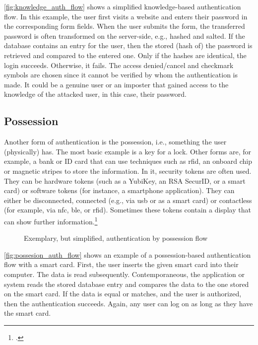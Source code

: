 \autoref{fig:knowledge_auth_flow} shows a simplified knowledge-based authentication flow. In this example, the user first visits a website and enters their password in the corresponding form fields. When the user submits the form, the transferred password is often transformed on the server-side, e.g., hashed and salted. If the database contains an entry for the user, then the stored (hash of) the password is retrieved and compared to the entered one. Only if the hashes are identical, the login succeeds. Otherwise, it fails. The \frqq access denied/cancel\flqq{} and \frqq checkmark\flqq{} symbols are chosen since it cannot be verified by whom the authentication is made. It could be a genuine user or an imposter that gained access to the knowledge of the attacked user, in this case, their password.

\subsection{Possession}

Another form of authentication is the possession, i.e., \frqq something the user (physically) has\flqq{}. The most basic example is a key for a lock. Other forms are, for example, a bank or ID card that can use techniques such as \gls{rfid}, an onboard chip or magnetic stripes to store the information. In \gls{it}, security tokens are often used. They can be hardware tokens (such as a YubiKey, an RSA SecurID, or a smart card) or software tokens (for instance, a smartphone application). They can either be disconnected, connected (e.g., via \gls{usb} or as a smart card) or contactless (for example, via \gls{nfc}, \gls{ble}, or \gls{rfid}). Sometimes these tokens contain a display that can show further information.\footcites[See][24]{265831}[See][]{Dressel:2019:SZT:3319499.3328225}[See][8--11]{Mayes2017}

\begin{figure}[hbt]
	\centering
	
	\caption[Exemplary, but simplified, authentication by possession flow]{Exemplary, but simplified, authentication by possession flow\footnotemark}
	\label{fig:possesion_auth_flow}
\end{figure}

\autoref{fig:possesion_auth_flow} shows an example of a possession-based authentication flow with a smart card. First, the user inserts the given smart card into their computer. The data is read subsequently. Contemporaneous, the application or system reads the stored database entry and compares the data to the one stored on the smart card. If the data is equal or matches, and the user is authorized, then the authentication succeeds. Again, any user can log on as long as they have the smart card.

